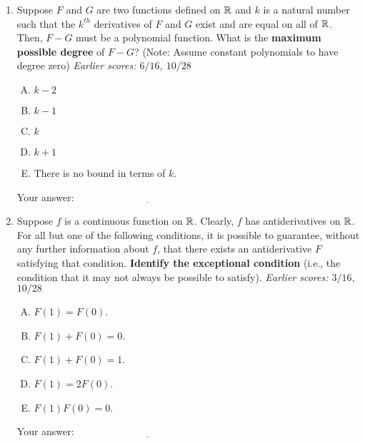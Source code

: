 \documentclass[10pt]{amsart}
\begin{document}
\begin{enumerate}
\item Suppose $F$ and $G$ are two functions defined on $\mathbb{R}$ and $k$ is
  a natural number such that the $k^{th}$ derivatives of $F$ and $G$
  exist and are equal on all of $\mathbb{R}$. Then, $F - G$ must be a
  polynomial function. What is the {\bf maximum possible degree} of $F
  - G$?  (Note: Assume constant polynomials to have degree zero) {\em
  Earlier scores: $6/16$, $10/28$}

  \begin{enumerate}[(A)]
  \item $k - 2$
  \item $k - 1$
  \item $k$
  \item $k + 1$
  \item There is no bound in terms of $k$.
  \end{enumerate}

  \vspace{0.05in}
  Your answer: $\underline{\qquad\qquad\qquad\qquad\qquad\qquad\qquad}$
  \vspace{0.05in}

\item Suppose $f$ is a continuous function on $\mathbb{R}$. Clearly, $f$ has
  antiderivatives on $\mathbb{R}$. For all but one of the following
  conditions, it is possible to guarantee, without any further
  information about $f$, that there exists an antiderivative $F$
  satisfying that condition. {\bf Identify the exceptional condition}
  (i.e., the condition that it may not always be possible to
  satisfy). {\em Earlier scores: $3/16$, $10/28$}

  \begin{enumerate}[(A)]
  \item $F(1) = F(0)$.
  \item $F(1) + F(0) = 0$.
  \item $F(1) + F(0) = 1$.
  \item $F(1) = 2F(0)$.
  \item $F(1)F(0) = 0$.
  \end{enumerate}

  \vspace{0.05in}
  Your answer: $\underline{\qquad\qquad\qquad\qquad\qquad\qquad\qquad}$
  \vspace{0.05in}


\end{enumerate}
\end{document}
